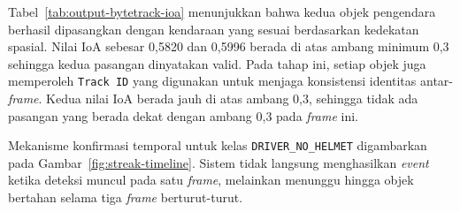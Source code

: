 \begin{table}[htbp]
\centering
\caption{Keluaran ByteTrack dan nilai IoA pada \textit{frame} awal.}
\label{tab:output-bytetrack-ioa}
\small
{}
\end{table}

Tabel~\ref{tab:output-bytetrack-ioa} menunjukkan bahwa kedua objek pengendara berhasil dipasangkan dengan kendaraan yang sesuai berdasarkan kedekatan spasial. Nilai IoA sebesar 0,5820 dan 0,5996 berada di atas ambang minimum 0,3 sehingga kedua pasangan dinyatakan valid. Pada tahap ini, setiap objek juga memperoleh \texttt{Track ID} yang digunakan untuk menjaga konsistensi identitas antar-\textit{frame}. Kedua nilai IoA berada jauh di atas ambang 0,3, sehingga tidak ada pasangan yang berada dekat dengan ambang 0,3 pada \textit{frame} ini.

Mekanisme konfirmasi temporal untuk kelas \texttt{DRIVER\_NO\_HELMET} digambarkan pada Gambar~\ref{fig:streak-timeline}. Sistem tidak langsung menghasilkan \textit{event} ketika deteksi muncul pada satu \textit{frame}, melainkan menunggu hingga objek bertahan selama tiga \textit{frame} berturut-turut.

